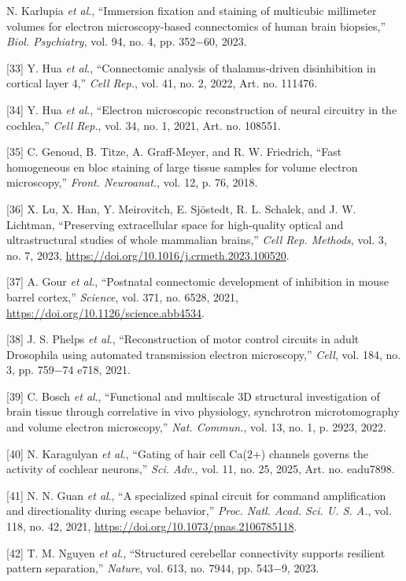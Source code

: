 \documentclass{article}
\begin{document}
\begin{hangpars}
[32] N. Karlupia \emph{et al}., “Immersion fixation and staining of multicubic millimeter volumes for electron microscopy-based connectomics of human brain biopsies,” \emph{Biol. Psychiatry}, vol. 94, no. 4, pp. 352−60, 2023.

[33] Y. Hua \emph{et al}., “Connectomic analysis of thalamus-driven disinhibition in cortical layer 4,” \emph{Cell Rep.}, vol. 41, no. 2, 2022, Art. no. 111476.

[34] Y. Hua \emph{et al}., “Electron microscopic reconstruction of neural circuitry in the cochlea,” \emph{Cell Rep.}, vol. 34, no. 1, 2021, Art. no. 108551.

[35] C. Genoud, B. Titze, A. Graff-Meyer, and R. W. Friedrich, “Fast homogeneous en bloc staining of large tissue samples for volume electron microscopy,” \emph{Front. Neuroanat.}, vol. 12, p. 76, 2018.

[36] X. Lu, X. Han, Y. Meirovitch, E. Sjöstedt, R. L. Schalek, and J. W. Lichtman, “Preserving extracellular space for high-quality optical and ultrastructural studies of whole mammalian brains,” \emph{Cell Rep. Methods}, vol. 3, no. 7, 2023, \url{https://doi.org/10.1016/j.crmeth.2023.100520}.

[37] A. Gour \emph{et al}., “Postnatal connectomic development of inhibition in mouse barrel cortex,” \emph{Science}, vol. 371, no. 6528, 2021, \url{https://doi.org/10.1126/science.abb4534}.

[38] J. S. Phelps \emph{et al}., “Reconstruction of motor control circuits in adult Drosophila using automated transmission electron microscopy,” \emph{Cell}, vol. 184, no. 3, pp. 759−74 e718, 2021.

[39] C. Bosch \emph{et al}., “Functional and multiscale 3D structural investigation of brain tissue through correlative in vivo physiology, synchrotron microtomography and volume electron microscopy,” \emph{Nat. Commun.}, vol. 13, no. 1, p. 2923, 2022.

[40] N. Karagulyan \emph{et al}., “Gating of hair cell Ca(2+) channels governs the activity of cochlear neurons,” \emph{Sci. Adv.}, vol. 11, no. 25, 2025, Art. no. eadu7898.

[41] N. N. Guan \emph{et al}., “A specialized spinal circuit for command amplification and directionality during escape behavior,” \emph{Proc. Natl. Acad. Sci. U. S. A.}, vol. 118, no. 42, 2021, \url{https://doi.org/10.1073/pnas.2106785118}.

[42] T. M. Nguyen \emph{et al}., “Structured cerebellar connectivity supports resilient pattern separation,” \emph{Nature}, vol. 613, no. 7944, pp. 543−9, 2023.


\end{hangpars}
\end{document}
